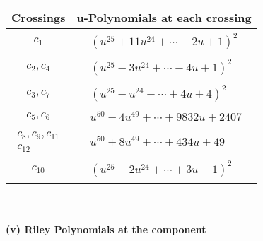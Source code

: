 \documentclass[1p]{elsarticle_modified}
\theoremstyle{definition}
\begin{document}
\begin{tabular}{m{50pt}|m{274pt}}
Crossings & \hspace{64pt}u-Polynomials at each crossing \\
\hline $$\begin{aligned}c_{1}\end{aligned}$$&$\begin{aligned}
&(u^{25}+11 u^{24}+\cdots-2 u+1)^{2}
\end{aligned}$\\
\hline $$\begin{aligned}c_{2},c_{4}\end{aligned}$$&$\begin{aligned}
&(u^{25}-3 u^{24}+\cdots-4 u+1)^{2}
\end{aligned}$\\
\hline $$\begin{aligned}c_{3},c_{7}\end{aligned}$$&$\begin{aligned}
&(u^{25}- u^{24}+\cdots+4 u+4)^{2}
\end{aligned}$\\
\hline $$\begin{aligned}c_{5},c_{6}\end{aligned}$$&$\begin{aligned}
&u^{50}-4 u^{49}+\cdots+9832 u+2407
\end{aligned}$\\
\hline $$\begin{aligned}c_{8},c_{9},c_{11}\\c_{12}\end{aligned}$$&$\begin{aligned}
&u^{50}+8 u^{49}+\cdots+434 u+49
\end{aligned}$\\
\hline $$\begin{aligned}c_{10}\end{aligned}$$&$\begin{aligned}
&(u^{25}-2 u^{24}+\cdots+3 u-1)^{2}
\end{aligned}$\\
\hline
\end{tabular}\\~\\
\newpage\renewcommand{\arraystretch}{1}
\flushleft \textbf{(v) Riley Polynomials at the component}\newline \\
\end{document}
